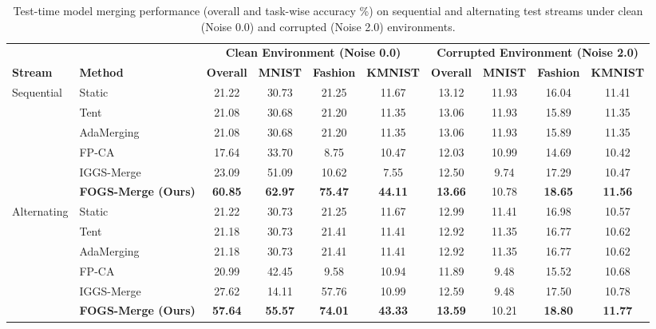 \documentclass{article}
\theoremstyle{plain}
\theoremstyle{definition}
\theoremstyle{remark}
\begin{document}
\begin{table}[t]
\caption{Test-time model merging performance (overall and task-wise accuracy \%) on sequential and alternating test streams under clean (Noise 0.0) and corrupted (Noise 2.0) environments.}
\label{tab:results}
\vskip 0.15in
\begin{center}
\begin{small}
\begin{sc}
\setlength{\tabcolsep}{4.0pt}
\begin{tabular}{llcccc|cccc}
\toprule
& & \multicolumn{4}{c}{\textbf{Clean Environment (Noise 0.0)}} & \multicolumn{4}{c}{\textbf{Corrupted Environment (Noise 2.0)}} \\
\textbf{Stream} & \textbf{Method} & \textbf{Overall} & \textbf{MNIST} & \textbf{Fashion} & \textbf{KMNIST} & \textbf{Overall} & \textbf{MNIST} & \textbf{Fashion} & \textbf{KMNIST} \\
\midrule
Sequential & Static & 21.22 & 30.73 & 21.25 & 11.67 & 13.12 & 11.93 & 16.04 & 11.41 \\
& Tent & 21.08 & 30.68 & 21.20 & 11.35 & 13.06 & 11.93 & 15.89 & 11.35 \\
& AdaMerging & 21.08 & 30.68 & 21.20 & 11.35 & 13.06 & 11.93 & 15.89 & 11.35 \\
& FP-CA & 17.64 & 33.70 & 8.75 & 10.47 & 12.03 & 10.99 & 14.69 & 10.42 \\
& IGGS-Merge & 23.09 & 51.09 & 10.62 & 7.55 & 12.50 & 9.74 & 17.29 & 10.47 \\
& \textbf{FOGS-Merge (Ours)} & \textbf{60.85} & \textbf{62.97} & \textbf{75.47} & \textbf{44.11} & \textbf{13.66} & 10.78 & \textbf{18.65} & \textbf{11.56} \\
\midrule
Alternating & Static & 21.22 & 30.73 & 21.25 & 11.67 & 12.99 & 11.41 & 16.98 & 10.57 \\
& Tent & 21.18 & 30.73 & 21.41 & 11.41 & 12.92 & 11.35 & 16.77 & 10.62 \\
& AdaMerging & 21.18 & 30.73 & 21.41 & 11.41 & 12.92 & 11.35 & 16.77 & 10.62 \\
& FP-CA & 20.99 & 42.45 & 9.58 & 10.94 & 11.89 & 9.48 & 15.52 & 10.68 \\
& IGGS-Merge & 27.62 & 14.11 & 57.76 & 10.99 & 12.59 & 9.48 & 17.50 & 10.78 \\
& \textbf{FOGS-Merge (Ours)} & \textbf{57.64} & \textbf{55.57} & \textbf{74.01} & \textbf{43.33} & \textbf{13.59} & 10.21 & \textbf{18.80} & \textbf{11.77} \\
\bottomrule
\end{tabular}
\end{sc}
\end{small}
\end{center}
\vskip -0.1in
\end{table}
\end{document}
